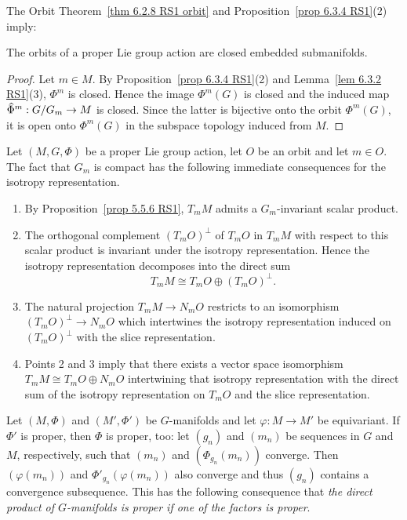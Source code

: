 The Orbit Theorem~\ref{thm 6.2.8 RS1 orbit} and Proposition~\ref{prop 6.3.4 RS1}(2) imply:

\begin{cor}
    The orbits of a proper Lie group action are closed embedded submanifolds.
\end{cor}
\begin{proof}
    Let $m\in M$. By Proposition~\ref{prop 6.3.4 RS1}(2) and Lemma~\ref{lem 6.3.2 RS1}(3), $\Phi^m$ is closed. Hence the image $\Phi^m(G)$ is closed and the induced map  $\wh{\Phi}^m:G\slash G_m\to M$ is closed. Since the latter is bijective onto the orbit $\Phi^m(G)$, it is open onto $\Phi^m(G)$ in the subspace topology induced from $M$.
\end{proof}

\begin{rem}\label{rem 6.3.6 RS1}
    Let $(M,G,\Phi)$ be a proper Lie group action, let $O$ be an orbit and let $m\in O$. The fact that $G_m$ is compact has the following immediate consequences for the isotropy representation.
    \begin{enumerate}
        \item By Proposition~\ref{prop 5.5.6 RS1}, $T_mM$ admits a $G_m$-invariant scalar product.
        \item The orthogonal complement $(T_mO)^\perp$ of $T_mO$  in $T_mM$ with respect to this scalar product is invariant under the isotropy representation. Hence the isotropy representation decomposes into the direct sum
        \[T_mM\cong T_mO\oplus (T_mO)^\perp.\]
        \item The natural projection $T_mM\to N_mO$ restricts to an isomorphism $(T_mO)^\perp\to N_mO$ which intertwines the isotropy representation induced on $(T_mO)^\perp$ with the slice representation.
        \item Points 2 and 3 imply that there exists a vector space isomorphism $T_mM\cong T_mO\oplus N_mO$ intertwining that isotropy representation with the direct sum of the isotropy representation on $T_mO$ and the slice representation.
    \end{enumerate}
\end{rem}

\begin{rem}\label{rem 6.3.9 RS1}
    Let $(M,\Phi)$ and $(M',\Phi')$ be $G$-manifolds and let $\varphi:M\to M'$ be equivariant. If $\Phi'$ is proper, then $\Phi$ is proper, too: let $(g_n)$ and $(m_n)$ be sequences in $G$ and $M$, respectively, such that $(m_n)$ and $(\Phi_{g_n}(m_n))$ converge. Then $(\varphi(m_n))$ and $\Phi'_{g_n}(\varphi(m_n))$ also converge and thus $(g_n)$ contains a convergence subsequence. This has the following consequence that \emph{the direct product of $G$-manifolds is proper if one of the factors is proper}.
\end{rem}




